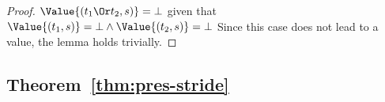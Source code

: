 \begin{proof}
\case
{$\Value{(t_1\Or t_2,s)}=\bot$ given that
  $\Value{(t_1,s)}=\bot\wedge\Value{(t_2,s)}=\bot$}{ Since this case does not
  lead to a value, the lemma holds trivially.}


\end{proof}



\subsection{Theorem~\ref{thm:pres-stride}}


